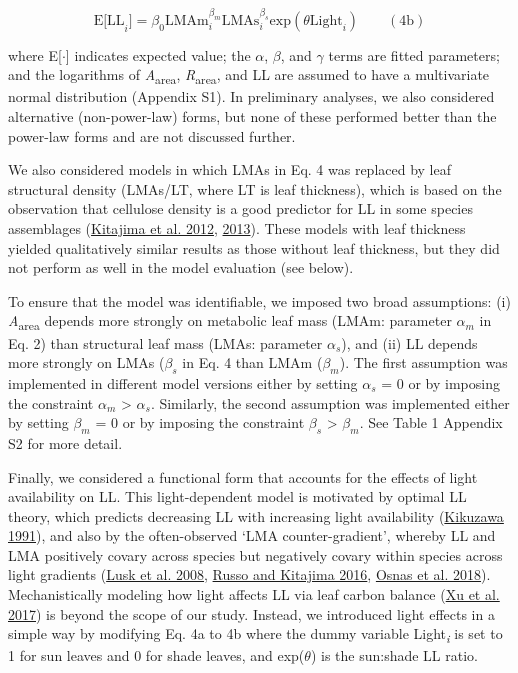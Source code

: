 \documentclass[
  12pt,
  letterpaper,
  DIV=11,
  numbers=noendperiod]{scrartcl}
\begin{document}
\[
\mathrm{E[LL}_i] = \beta_0\mathrm{LMAm}_{i}^{\beta_m} \mathrm{LMAs}_{i}^{\beta_s} \mathrm{exp}(\theta \mathrm{Light}_i) \qquad(4\mathrm{b})
\]

where E{[}\(\cdot\){]} indicates expected value; the \(\alpha\),
\(\beta\), and \(\gamma\) terms are fitted parameters; and the
logarithms of \emph{A}\textsubscript{area},
\emph{R}\textsubscript{area}, and LL are assumed to have a multivariate
normal distribution (Appendix S1). In preliminary analyses, we also
considered alternative (non-power-law) forms, but none of these
performed better than the power-law forms and are not discussed further.

We also considered models in which LMAs in Eq. 4 was replaced by leaf
structural density (LMAs/LT, where LT is leaf thickness), which is based
on the observation that cellulose density is a good predictor for LL in
some species assemblages (\protect\hyperlink{ref-Kitajima2012}{Kitajima
et al. 2012}, \protect\hyperlink{ref-Kitajima2013}{2013}). These models
with leaf thickness yielded qualitatively similar results as those
without leaf thickness, but they did not perform as well in the model
evaluation (see below).

To ensure that the model was identifiable, we imposed two broad
assumptions: (i) \emph{A}\textsubscript{area} depends more strongly on
metabolic leaf mass (LMAm: parameter \(\alpha_m\) in Eq. 2) than
structural leaf mass (LMAs: parameter \(\alpha_s\)), and (ii) LL depends
more strongly on LMAs (\(\beta_s\) in Eq. 4 than LMAm (\(\beta_m\)). The
first assumption was implemented in different model versions either by
setting \(\alpha_s\) = 0 or by imposing the constraint \(\alpha_m\)
\textgreater{} \(\alpha_s\). Similarly, the second assumption was
implemented either by setting \(\beta_m\) = 0 or by imposing the
constraint \(\beta_s\) \textgreater{} \(\beta_m\). See Table 1 Appendix
S2 for more detail.

Finally, we considered a functional form that accounts for the effects
of light availability on LL. This light-dependent model is motivated by
optimal LL theory, which predicts decreasing LL with increasing light
availability (\protect\hyperlink{ref-Kikuzawa1991}{Kikuzawa 1991}), and
also by the often-observed `LMA counter-gradient', whereby LL and LMA
positively covary across species but negatively covary within species
across light gradients (\protect\hyperlink{ref-Lusk2008}{Lusk et al.
2008}, \protect\hyperlink{ref-Russo2016}{Russo and Kitajima 2016},
\protect\hyperlink{ref-Osnas2018}{Osnas et al. 2018}). Mechanistically
modeling how light affects LL via leaf carbon balance
(\protect\hyperlink{ref-Xu2017}{Xu et al. 2017}) is beyond the scope of
our study. Instead, we introduced light effects in a simple way by
modifying Eq. 4a to 4b where the dummy variable
Light\textsubscript{\emph{i}} is set to 1 for sun leaves and 0 for shade
leaves, and exp(\(\theta\)) is the sun:shade LL ratio.
\end{document}
